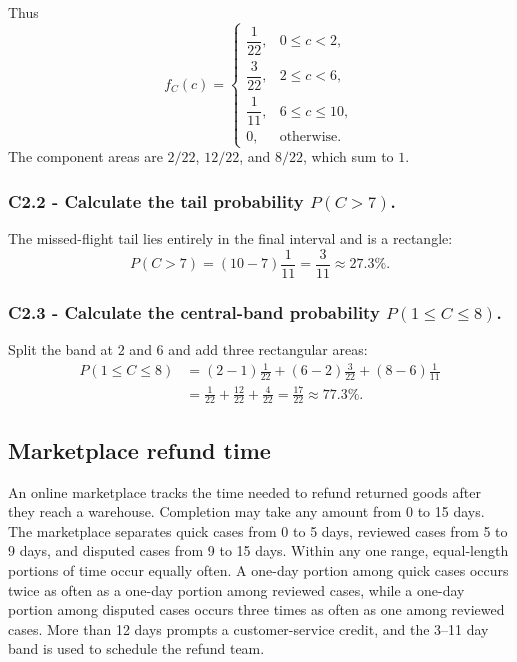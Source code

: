 Thus
\[
 f_C(c)=\begin{cases}
 \dfrac1{22},&0\le c<2,\\[1mm]
 \dfrac3{22},&2\le c<6,\\[1mm]
 \dfrac1{11},&6\le c\le10,\\[1mm]
 0,&\text{otherwise.}
 \end{cases}
\]
The component areas are $2/22$, $12/22$, and $8/22$, which sum to $1$.

\subsubsection*{C2.2 - Calculate the tail probability $P(C>7)$.}
\label{subsec:c2-piecewise-uniform-cargo-b}
The missed-flight tail lies entirely in the final interval and is a rectangle:
\[
 P(C>7)=(10-7)\frac1{11}=\frac3{11}\approx27.3\%.
\]

\subsubsection*{C2.3 - Calculate the central-band probability
$P(1\le C\le8)$.}
\label{subsec:c2-piecewise-uniform-cargo-c}
Split the band at $2$ and $6$ and add three rectangular areas:
\[
 \begin{aligned}
 P(1\le C\le8)
 &=(2-1)\frac1{22}+(6-2)\frac3{22}+(8-6)\frac1{11}\\
 &=\frac1{22}+\frac{12}{22}+\frac4{22}=\frac{17}{22}\approx77.3\%.
 \end{aligned}
\]

\subsection{Marketplace refund time}\label{sec:c2-piecewise-uniform-refund}
An online marketplace tracks the time needed to refund returned goods after
they reach a warehouse.  Completion may take any amount from 0 to 15 days.
The marketplace separates quick cases from 0 to 5 days, reviewed cases from 5
to 9 days, and disputed cases from 9 to 15 days.  Within any one range,
equal-length portions of time occur equally often.  A one-day portion among
quick cases occurs twice as often as a one-day portion among reviewed cases,
while a one-day portion among disputed cases occurs three times as often as one
among reviewed cases.  More than 12 days prompts a customer-service credit, and
the 3--11 day band is used to schedule the refund team.

